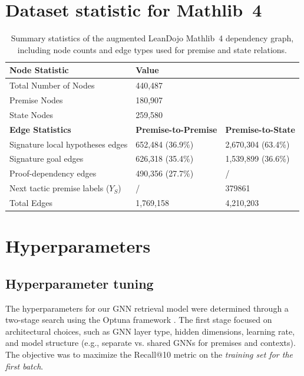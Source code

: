 \appendix

\section{Dataset statistic for Mathlib~4}

\begin{table}[H]
\caption{Summary statistics of the augmented LeanDojo Mathlib~4 dependency graph, including node counts and edge types used for premise and state relations.}
\label{tab:graph_stats}
\centering
\begin{tabular}{lll}
\toprule
\textbf{Node Statistic} & \textbf{Value} &  \\
\midrule
Total Number of Nodes & 440,487 & \\
\quad Premise Nodes & 180,907 & \\
\quad State Nodes & 259,580 & \\
\midrule
\textbf{Edge Statistics} & \textbf{Premise-to-Premise} & \textbf{Premise-to-State} \\
\midrule

Signature local hypotheses edges & 652,484 (36.9\%) & 2,670,304 (63.4\%) \\
Signature goal edges & 626,318 (35.4\%) & 1,539,899 (36.6\%) \\
Proof-dependency edges & 490,356 (27.7\%) & / \\
Next tactic premise labels ($Y_S$) & / & 379861 \\
\midrule
Total Edges & 1,769,158 & 4,210,203 \\
\bottomrule
\end{tabular}
\end{table}


\section{Hyperparameters}
\label{appendix:hyperparameters}

\subsection{Hyperparameter tuning}
The hyperparameters for our GNN retrieval model were determined through a two-stage search using the Optuna framework \citep{optuna}. The first stage focused on architectural choices, such as GNN layer type, hidden dimensions, learning rate, and model structure (e.g., separate vs. shared GNNs for premises and contexts). The objective was to maximize the Recall@10 metric on the \emph{training set for the first batch}.

